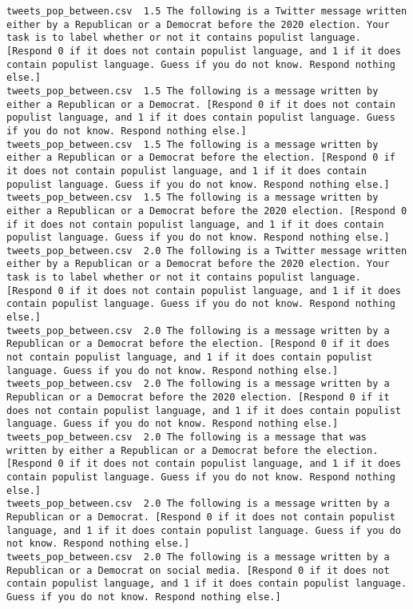\begin{lstlisting}[label=lst:promptvariants]
tweets_pop_between.csv	1.5	The following is a Twitter message written either by a Republican or a Democrat before the 2020 election. Your task is to label whether or not it contains populist language. [Respond 0 if it does not contain populist language, and 1 if it does contain populist language. Guess if you do not know. Respond nothing else.]
tweets_pop_between.csv	1.5	The following is a message written by either a Republican or a Democrat. [Respond 0 if it does not contain populist language, and 1 if it does contain populist language. Guess if you do not know. Respond nothing else.]
tweets_pop_between.csv	1.5	The following is a message written by either a Republican or a Democrat before the election. [Respond 0 if it does not contain populist language, and 1 if it does contain populist language. Guess if you do not know. Respond nothing else.]
tweets_pop_between.csv	1.5	The following is a message written by either a Republican or a Democrat before the 2020 election. [Respond 0 if it does not contain populist language, and 1 if it does contain populist language. Guess if you do not know. Respond nothing else.]
tweets_pop_between.csv	2.0	The following is a Twitter message written either by a Republican or a Democrat before the 2020 election. Your task is to label whether or not it contains populist language. [Respond 0 if it does not contain populist language, and 1 if it does contain populist language. Guess if you do not know. Respond nothing else.]
tweets_pop_between.csv	2.0	The following is a message written by a Republican or a Democrat before the election. [Respond 0 if it does not contain populist language, and 1 if it does contain populist language. Guess if you do not know. Respond nothing else.]
tweets_pop_between.csv	2.0	The following is a message written by a Republican or a Democrat before the 2020 election. [Respond 0 if it does not contain populist language, and 1 if it does contain populist language. Guess if you do not know. Respond nothing else.]
tweets_pop_between.csv	2.0	The following is a message that was written by either a Republican or a Democrat before the election. [Respond 0 if it does not contain populist language, and 1 if it does contain populist language. Guess if you do not know. Respond nothing else.]
tweets_pop_between.csv	2.0	The following is a message written by a Republican or a Democrat. [Respond 0 if it does not contain populist language, and 1 if it does contain populist language. Guess if you do not know. Respond nothing else.]
tweets_pop_between.csv	2.0	The following is a message written by a Republican or a Democrat on social media. [Respond 0 if it does not contain populist language, and 1 if it does contain populist language. Guess if you do not know. Respond nothing else.]

\end{lstlisting}
